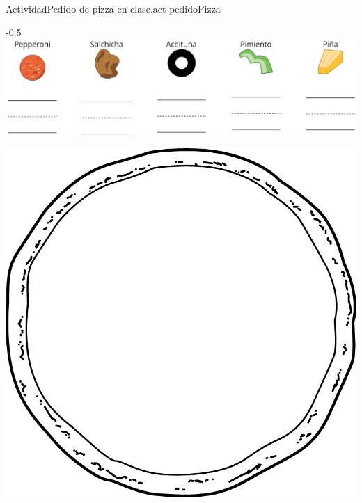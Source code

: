 \documentclass[20pt]{extarticle}
\begin{document}
\begin{activity}{Actividad}{Pedido de pizza en clase.}{act-pedidoPizza}%
\begin{image}{0}{1}{0}{-0.5\baselineskip}%
\includegraphics[max width=\linewidth, center]{external/png-source/0.2.D22.S.1 Pepperoni.png}
\end{image}%
\begin{image}{0}{1}{0}{}%
\includegraphics[width=0.95\linewidth, center]{external/png-source/pizza-draw.png}
\end{image}%
\end{activity}
\end{document}
